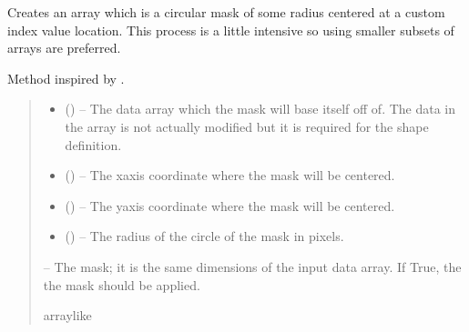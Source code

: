 \documentclass[letterpaper,11pt,english]{sphinxmanual}
\begin{document}
\begin{savenotes}\begin{fulllineitems}
\label{\detokenize{code/opihiexarata.library.image:opihiexarata.library.image.create_circular_mask}}
\pysigstartsignatures
{}
\pysigstopsignatures
\sphinxAtStartPar
Creates an array which is a circular mask of some radius centered at a
custom index value location. This process is a little intensive so using
smaller subsets of arrays are preferred.

\sphinxAtStartPar
Method inspired by .
\begin{quote}\begin{description}
\begin{itemize}
\item {} 
\sphinxAtStartPar
{} () – The data array which the mask will base itself off of. The data in the
array is not actually modified but it is required for the shape
definition.

\item {} 
\sphinxAtStartPar
{} () – The x\sphinxhyphen{}axis coordinate where the mask will be centered.

\item {} 
\sphinxAtStartPar
{} () – The y\sphinxhyphen{}axis coordinate where the mask will be centered.

\item {} 
\sphinxAtStartPar
{} () – The radius of the circle of the mask in pixels.

\end{itemize}

\sphinxAtStartPar
{} – The mask; it is the same dimensions of the input data array. If True,
the the mask should be applied.

\sphinxAtStartPar
array\sphinxhyphen{}like

\end{description}\end{quote}

\end{fulllineitems}\end{savenotes}
\end{document}
